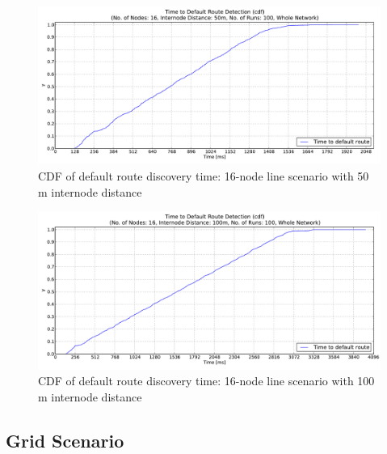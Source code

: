 \begin{figure}[htpb]
  \begin{center}
    \leavevmode
      \includegraphics[scale=0.38]
      {Pics/results/16/MRHOF/line/dist50_montecarlo_cdf_hist.pdf}
   \caption{CDF of default route discovery time: 16-node line scenario with 50 m internode distance}
   \label{fig:16_MRHOF_line_50_cdf}
  \end{center}
\end{figure}

\begin{figure}[htpb]
  \begin{center}
    \leavevmode
      \includegraphics[scale=0.38]
      {Pics/results/16/MRHOF/line/dist100_montecarlo_cdf_hist.pdf}
   \caption{CDF of default route discovery time: 16-node line scenario with 100 m internode distance}
   \label{fig:16_MRHOF_line_100_cdf}
    \vspace{6in}
  \end{center}
\end{figure}

\clearpage
\subsection{Grid Scenario}
\label{Appx:cdf:grid}

